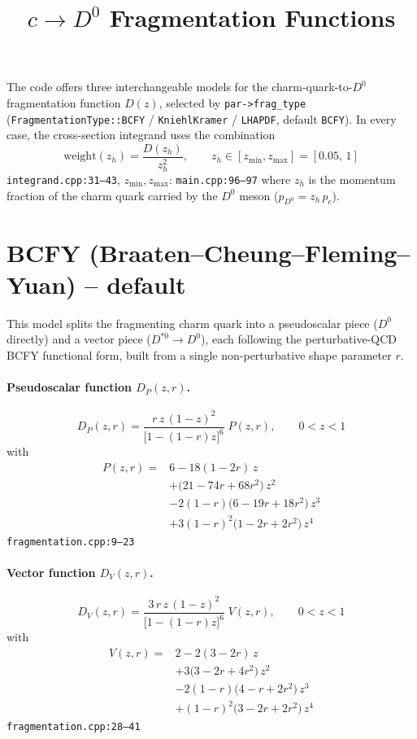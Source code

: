 \documentclass[11pt]{article}
\title{$c\to D^0$ Fragmentation Functions}
\author{}
\date{}
\newcommand{\code}[1]{\texttt{#1}}
\begin{document}
\maketitle

\noindent The code offers three interchangeable models for the charm-quark-to-$D^0$ fragmentation function $D(z)$, selected by \code{par->frag\_type} (\code{FragmentationType::BCFY} / \code{KniehlKramer} / \code{LHAPDF}, default \code{BCFY}). In every case, the cross-section integrand uses the combination
\begin{equation}
  \text{weight}(z_h) = \frac{D(z_h)}{z_h^2}, \qquad z_h\in[z_{\min},z_{\max}]=[0.05,\,1]
  \label{eq:weight}
\end{equation}
\hfill{\footnotesize\code{integrand.cpp:31--43}, $z_{\min},z_{\max}$: \code{main.cpp:96--97}}
where $z_h$ is the momentum fraction of the charm quark carried by the $D^0$ meson ($p_{D^0}=z_h\,p_c$).

\section{BCFY (Braaten--Cheung--Fleming--Yuan) -- default}
This model splits the fragmenting charm quark into a pseudoscalar piece ($D^0$ directly) and a vector piece ($D^{*0}\to D^0$), each following the perturbative-QCD BCFY functional form, built from a single non-perturbative shape parameter $r$.

\paragraph{Pseudoscalar function $D_P(z,r)$.}
\begin{equation}
  D_P(z,r) = \frac{r\,z\,(1-z)^2}{\big[1-(1-r)z\big]^{6}}\;P(z,r), \qquad 0<z<1
\end{equation}
with
\begin{align}
  P(z,r) = {}& 6 - 18(1-2r)\,z \nonumber\\
  & + \big(21-74r+68r^2\big)\,z^2 \nonumber\\
  & - 2(1-r)\big(6-19r+18r^2\big)\,z^3 \nonumber\\
  & + 3(1-r)^2\big(1-2r+2r^2\big)\,z^4
\end{align}
\hfill{\footnotesize\code{fragmentation.cpp:9--23}}

\paragraph{Vector function $D_V(z,r)$.}
\begin{equation}
  D_V(z,r) = \frac{3\,r\,z\,(1-z)^2}{\big[1-(1-r)z\big]^{6}}\;V(z,r), \qquad 0<z<1
\end{equation}
with
\begin{align}
  V(z,r) = {}& 2 - 2(3-2r)\,z \nonumber\\
  & + 3\big(3-2r+4r^2\big)\,z^2 \nonumber\\
  & - 2(1-r)\big(4-r+2r^2\big)\,z^3 \nonumber\\
  & + (1-r)^2\big(3-2r+2r^2\big)\,z^4
\end{align}
\hfill{\footnotesize\code{fragmentation.cpp:28--41}}
\end{document}
